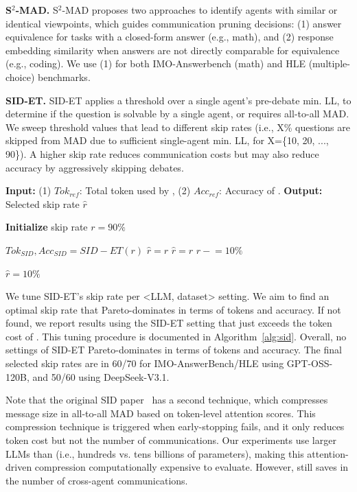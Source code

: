 \noindent\textbf{S$^2$-MAD.} S$^2$-MAD proposes two approaches to identify agents with similar or identical viewpoints, which guides communication pruning decisions: (1) answer equivalence for tasks with a closed-form answer (e.g., math), and (2) response embedding similarity when answers are not directly comparable for equivalence (e.g., coding). We use (1) for both IMO-Answerbench (math) and HLE (multiple-choice) benchmarks.

\noindent\textbf{SID-ET.} SID-ET applies a threshold over a single agent's pre-debate min. LL, to determine if the question is solvable by a single agent, or requires all-to-all MAD. We sweep threshold values that lead to different skip rates (i.e., X\% questions are skipped from MAD due to sufficient single-agent min. LL, for X=\big\{10, 20, ..., 90\big\}). A higher skip rate reduces communication costs but may also reduce accuracy by aggressively skipping debates.

\begin{algorithm}
\caption{\label{alg:sid}Skip rate tuning for SID-ET.}
\begin{algorithmic}[1]
\Statex \textbf{Input:} (1) $Tok_{ref}$: Total token used by \sysname, (2) $Acc_{ref}$: Accuracy of \sysname.
\Statex \textbf{Output:} Selected skip rate $\hat{r}$

\State \textbf{Initialize} skip rate $r = 90\%$

    \State $Tok_{SID}, Acc_{SID} = SID-ET(r)$
        \State \Return $\hat{r} = r$
        \State \Return $\hat{r} = r$
    \EndIf
    \State $r \mathrel{-}= 10\%$
\EndWhile

\State \Return $\hat{r} = 10\%$
\end{algorithmic}
\end{algorithm}

We tune SID-ET's skip rate per <LLM, dataset> setting. We aim to find an optimal skip rate that Pareto-dominates \sysname in terms of tokens and accuracy. If not found, we report results using the SID-ET setting that just exceeds the token cost of \sysname. This tuning procedure is documented in Algorithm~\ref{alg:sid}. Overall, no settings of SID-ET Pareto-dominates \sysname in terms of tokens and accuracy. The final selected skip rates are in 60/70 for IMO-AnswerBench/HLE using GPT-OSS-120B, and 50/60 using DeepSeek-V3.1.

Note that the original SID paper~\citep{Chen2025Sid} has a second technique, which compresses message size in all-to-all MAD based on token-level attention scores. This compression technique is triggered when early-stopping fails, and it only reduces token cost but not the number of communications. Our experiments use larger LLMs than \cite{Chen2025Sid} (i.e., hundreds vs. tens billions of parameters), making this attention-driven compression computationally expensive to evaluate. However, \sysname still saves in the number of cross-agent communications.

